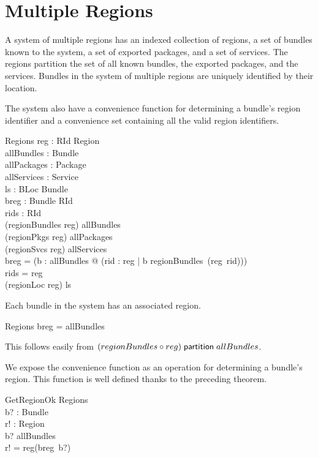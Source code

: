 \documentclass[a4paper,9pt]{article}
\begin{document}
\section{Multiple Regions}
\label{cha:multiregions}

A system of multiple regions has an indexed collection of regions, a set of bundles known to the
system, a set of exported packages, and a set of services.
The regions partition the set of all known bundles, the exported packages, and the services.
Bundles in the system of multiple regions are uniquely identified by their location.

The system also have a convenience function for determining a bundle's region identifier
and a convenience set containing all the valid region identifiers.
\begin{schema}{Regions}
  reg : RId \pfun Region \\
  allBundles : \power Bundle \\
  allPackages : \power Package \\
  allServices : \power Service \\
  ls : BLoc \pinj Bundle \\
  breg : Bundle \pfun RId \\
  rids : \power RId \\
\where
 (regionBundles \circ reg) \partition allBundles \\
 (regionPkgs \circ reg) \partition allPackages \\
 (regionSvcs \circ reg) \partition allServices \\
 breg = (\lambda b : allBundles @ (\mu rid : \dom reg | b \in regionBundles~(reg~rid))) \\
 rids = \dom reg \\
 (regionLoc \circ reg) \partition ls \\
\end{schema}

Each bundle in the system has an associated region.
\begin{argue}
  Regions \shows \dom breg = allBundles \\
\end{argue}
This follows easily from $(regionBundles \circ reg) \mathrel{\mathsf{partition}} allBundles$.

We expose the convenience function as an operation for determining a bundle's region.
This function is well defined thanks to the preceding theorem.
\begin{schema}{GetRegionOk}
  \Xi Regions \\
  b? : Bundle \\
  r! : Region \\
\where
  b? \in allBundles \\
  r! = reg(breg~b?) \\
\end{schema}
\end{document}
